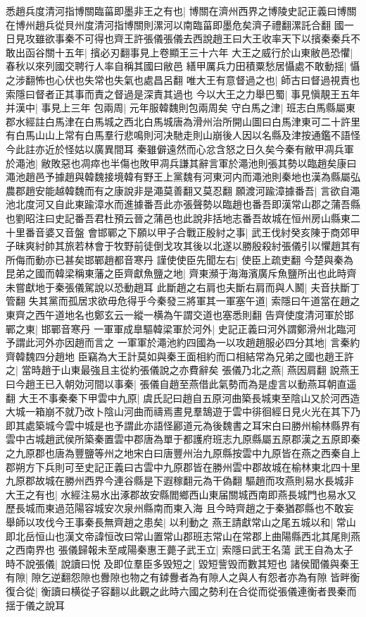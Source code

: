 悉趙兵度清河指博關臨菑即墨非王之有也|{
	博關在濟州西界之博陵史記正義曰博關在博州趙兵從貝州度清河指博關則漯河以南臨菑即墨危矣濟子禮翻漯託合翻
	}
國一日見攻雖欲事秦不可得也齊王許張儀張儀去西說趙王曰大王收率天下以擯秦秦兵不敢出函谷關十五年|{
	擯必刃翻事見上卷顯王三十六年
	}
大王之威行於山東敝邑恐懼|{
	春秋以來列國交聘行人率自稱其國曰敝邑
	}
繕甲厲兵力田積粟愁居懾處不敢動揺|{
	懾之涉翻怖也心伏也失常也失氣也處昌呂翻
	}
唯大王有意督過之也|{
	師古曰督過視責也索隱曰督者正其事而責之督過是深責其過也
	}
今以大王之力舉巴蜀|{
	事見愼靚王五年
	}
并漢中|{
	事見上三年
	}
包兩周|{
	元年服韓魏則包兩周矣
	}
守白馬之津|{
	班志白馬縣屬東郡水經註白馬津在白馬城之西北白馬城唐為滑州治所開山圖曰白馬津東可二十許里有白馬山山上常有白馬羣行悲鳴則河决馳走則山崩後人因以名縣及津按通鑑不語怪今此註亦近於怪姑以廣異間耳
	}
秦雖僻遠然而心忿含怒之日久矣今秦有敝甲凋兵軍於澠池|{
	敝敗惡也凋瘁也半傷也敗甲凋兵謙其辭言軍於澠池則張其勢以臨趙矣康曰澠池趙邑予據趙與韓魏接境韓有野王上黨魏有河東河内而澠池則秦地也漢為縣屬弘農郡趙安能越韓魏而有之康說非是澠莫善翻又莫忍翻
	}
願渡河踰漳據番吾|{
	言欲自澠池北度河又自此東踰漳水而進據番吾此亦張聲勢以臨趙也番吾即漢常山郡之蒲吾縣也劉昭注曰史記番吾君杜預云晉之蒲邑也此說非括地志番吾故城在恒州房山縣東二十里番音婆又音盤
	}
會邯鄲之下願以甲子合戰正殷紂之事|{
	武王伐紂癸亥陳于商郊甲子昧爽紂帥其旅若林會于牧野前徒倒戈攻其後以北遂以勝殷殺紂張儀引以懼趙其有所侮而動亦已甚矣邯鄲趙都音寒丹
	}
謹使使臣先聞左右|{
	使臣上疏吏翻
	}
今楚與秦為昆弟之國而韓梁稱東藩之臣齊獻魚鹽之地|{
	齊東瀕于海海濱廣斥魚鹽所出也此時齊未嘗獻地于秦張儀駕說以恐動趙耳
	}
此斷趙之右肩也夫斷右肩而與人鬭|{
	夫音扶斷丁管翻
	}
失其黨而孤居求欲毋危得乎今秦發三將軍其一軍塞午道|{
	索隱曰午道當在趙之東齊之西午道地名也鄭玄云一縱一横為午謂交道也塞悉則翻
	}
告齊使度清河軍於邯鄲之東|{
	邯鄲音寒丹
	}
一軍軍成臯驅韓梁軍於河外|{
	史記正義曰河外謂鄭滑州北臨河予謂此河外亦因趙而言之
	}
一軍軍於澠池約四國為一以攻趙趙服必四分其地|{
	言秦約齊韓魏四分趙地
	}
臣竊為大王計莫如與秦王面相約而口相結常為兄弟之國也趙王許之|{
	當時趙于山東最強且主從約張儀說之亦費辭矣
	}
張儀乃北之燕|{
	燕因肩翻
	}
說燕王曰今趙王已入朝効河間以事秦|{
	張儀自趙至燕借此氣勢而為是虛言以動燕耳朝直遥翻
	}
大王不事秦秦下甲雲中九原|{
	虞氏記曰趙自五原河曲築長城東至陰山又於河西造大城一箱崩不就乃改卜陰山河曲而禱焉晝見羣鵠遊于雲中徘徊經日見火光在其下乃即其處築城今雲中城是也予謂此亦語怪酈道元為後魏書之耳宋白曰勝州榆林縣界有雲中古城趙武侯所築秦置雲中郡唐為單于都護府班志九原縣屬五原郡漢之五原即秦之九原郡也唐為豐鹽等州之地宋白曰唐豐州治九原縣按雲中九原皆在燕之西秦自上郡朔方下兵則可至史記正義曰古雲中九原郡皆在勝州雲中郡故城在榆林東北四十里九原郡故城在勝州西界今連谷縣是下遐稼翻元為干偽翻
	}
驅趙而攻燕則易水長城非大王之有也|{
	水經注易水出涿郡故安縣閻鄉西山東届關城西南即燕長城門也易水又歷長城而東過范陽容城安次泉州縣南而東入海
	}
且今時齊趙之于秦猶郡縣也不敢妄舉師以攻伐今王事秦長無齊趙之患矣|{
	以利動之
	}
燕王請獻常山之尾五城以和|{
	常山即北岳恒山也漢文帝諱恒改曰常山置常山郡班志常山在常郡上曲陽縣西北其尾則燕之西南界也
	}
張儀歸報未至咸陽秦惠王薨子武王立|{
	索隱曰武王名蕩
	}
武王自為太子時不說張儀|{
	說讀曰悦
	}
及即位羣臣多毁短之|{
	毀短訾毁而數其短也
	}
諸侯聞儀與秦王有隙|{
	隙乞逆翻怨隙也釁隙也物之有鏬釁者為有隙人之與人有怨者亦為有隙
	}
皆畔衡復合從|{
	衡讀曰横從子容翻以此觀之此時六國之勢利在合從而從張儀連衡者畏秦而揺于儀之說耳
	}


